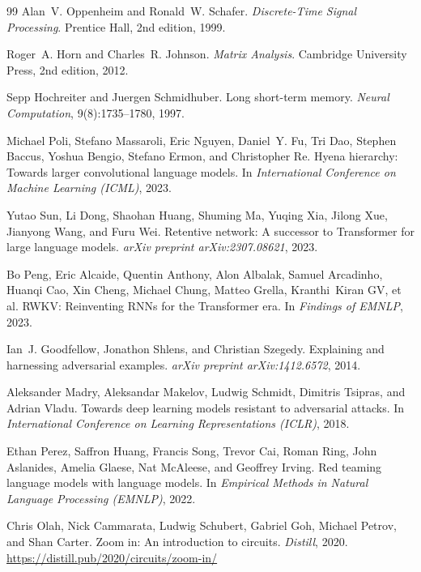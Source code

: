 \documentclass[10pt,twocolumn]{article}
\begin{document}
\begin{thebibliography}{99}
Alan~V. Oppenheim and Ronald~W. Schafer.
\newblock \emph{Discrete-Time Signal Processing}.
\newblock Prentice Hall, 2nd edition, 1999.

Roger~A. Horn and Charles~R. Johnson.
\newblock \emph{Matrix Analysis}.
\newblock Cambridge University Press, 2nd edition, 2012.

Sepp Hochreiter and Juergen Schmidhuber.
\newblock Long short-term memory.
\newblock \emph{Neural Computation}, 9(8):1735--1780, 1997.

Michael Poli, Stefano Massaroli, Eric Nguyen, Daniel~Y. Fu, Tri Dao, Stephen Baccus, Yoshua Bengio, Stefano Ermon, and Christopher Re.
\newblock Hyena hierarchy: Towards larger convolutional language models.
\newblock In \emph{International Conference on Machine Learning (ICML)}, 2023.

Yutao Sun, Li Dong, Shaohan Huang, Shuming Ma, Yuqing Xia, Jilong Xue, Jianyong Wang, and Furu Wei.
\newblock Retentive network: A successor to Transformer for large language models.
\newblock \emph{arXiv preprint arXiv:2307.08621}, 2023.

Bo Peng, Eric Alcaide, Quentin Anthony, Alon Albalak, Samuel Arcadinho, Huanqi Cao, Xin Cheng, Michael Chung, Matteo Grella, Kranthi~Kiran GV, et al.
\newblock RWKV: Reinventing RNNs for the Transformer era.
\newblock In \emph{Findings of EMNLP}, 2023.

Ian~J. Goodfellow, Jonathon Shlens, and Christian Szegedy.
\newblock Explaining and harnessing adversarial examples.
\newblock \emph{arXiv preprint arXiv:1412.6572}, 2014.

Aleksander Madry, Aleksandar Makelov, Ludwig Schmidt, Dimitris Tsipras, and Adrian Vladu.
\newblock Towards deep learning models resistant to adversarial attacks.
\newblock In \emph{International Conference on Learning Representations (ICLR)}, 2018.

Ethan Perez, Saffron Huang, Francis Song, Trevor Cai, Roman Ring, John Aslanides, Amelia Glaese, Nat McAleese, and Geoffrey Irving.
\newblock Red teaming language models with language models.
\newblock In \emph{Empirical Methods in Natural Language Processing (EMNLP)}, 2022.

Chris Olah, Nick Cammarata, Ludwig Schubert, Gabriel Goh, Michael Petrov, and Shan Carter.
\newblock Zoom in: An introduction to circuits.
\newblock \emph{Distill}, 2020.
\newblock \url{https://distill.pub/2020/circuits/zoom-in/}


\end{thebibliography}
\end{document}
